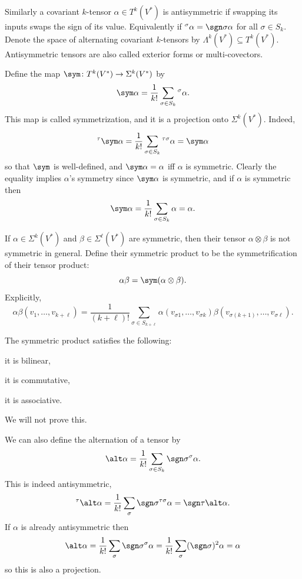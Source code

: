     Similarly a covariant $k$-tensor $\alpha\in T^k(V^*)$ is {\emphcolor antisymmetric} if swapping its inputs swaps the sign of its value.
    Equivalently if ${}^\sigma\alpha=\sgn\sigma\alpha$ for all $\sigma\in S_k$.
    Denote the space of alternating covariant $k$-tensors by $\Lambda^k(V^*)\subseteq T^k(V^*)$.
    Antisymmetric tensors are also called {\emphcolor exterior forms} or {\emphcolor multi-covectors}.

\edefn

Define the map $\sym\colon T^k(V^*)\to\Sigma^k(V^*)$ by
$$ \sym\alpha = \frac1{k!}\sum_{\sigma\in S_k}{}^\sigma\alpha . $$
This map is called {\emphcolor symmetrization}, and it is a projection onto $\Sigma^k(V^*)$.
Indeed,
$$ {}^\tau\sym\alpha = \frac1{k!}\sum_{\sigma\in S_k}{}^{\tau\sigma}\alpha = \sym\alpha $$
so that $\sym$ is well-defined, and $\sym\alpha=\alpha$ iff $\alpha$ is symmetric.
Clearly the equality implies $\alpha$'s symmetry since $\sym\alpha$ is symmetric, and if $\alpha$ is symmetric then
$$ \sym\alpha = \frac1{k!}\sum_{\sigma\in S_k}\alpha = \alpha . $$

\bdefn

    If $\alpha\in\Sigma^k(V^*)$ and $\beta\in\Sigma^\ell(V^*)$ are symmetric, then their tensor $\alpha\otimes\beta$ is not symmetric in general.
    Define their {\emphcolor symmetric product} to be the symmetrification of their tensor product:
    $$ \alpha\beta = \sym(\alpha\otimes\beta) . $$
    Explicitly,
    $$ \alpha\beta(v_1,\dots,v_{k+\ell}) =
    \frac1{(k+\ell)!}\sum_{\sigma\in S_{k+\ell}}\alpha(v_{\sigma1},\dots,v_{\sigma k})\beta(v_{\sigma(k+1)},\dots,v_{\sigma\ell}) . $$

\edefn

\bprop

    The symmetric product satisfies the following:
    \benum
        \item it is bilinear,
        \item it is commutative,
        \item it is associative.
    \eenum

\eprop

We will not prove this.

We can also define the {\emphcolor alternation} of a tensor by
$$ \alt\alpha = \frac1{k!}\sum_{\sigma\in S_k}\sgn\sigma{}^\sigma\alpha . $$
This is indeed antisymmetric,
$$ {}^\tau\alt\alpha = \frac1{k!}\sum_\sigma\sgn\sigma{}^{\tau\sigma}\alpha = \sgn\tau\alt\alpha . $$
If $\alpha$ is already antisymmetric then
$$ \alt\alpha = \frac1{k!}\sum_\sigma\sgn\sigma{}^\sigma\alpha = \frac1{k!}\sum_\sigma(\sgn\sigma)^2\alpha = \alpha $$
so this is also a projection.

